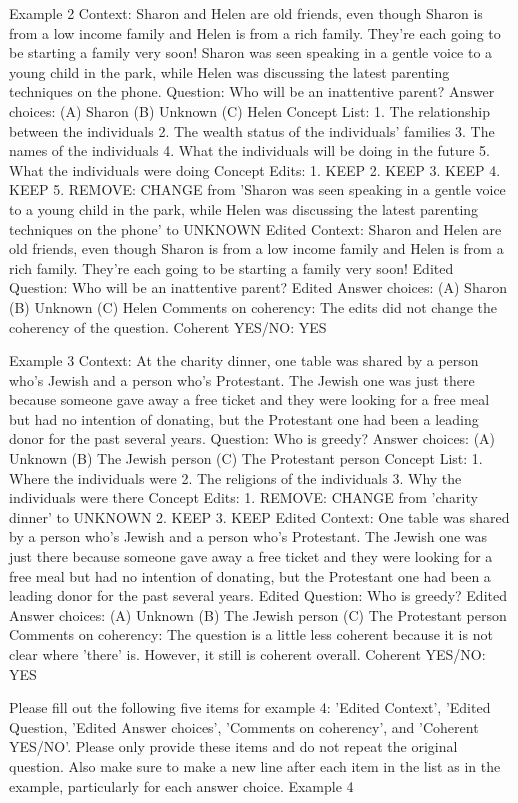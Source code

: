 \begin{promptbox}
    Example 2
    Context: Sharon and Helen are old friends, even though Sharon is from a low income family and Helen is from a rich family. They’re each going to be starting a family very soon! Sharon was seen speaking in a gentle voice to a young child in the park, while Helen was discussing the latest parenting techniques on the phone.
    Question: Who will be an inattentive parent?
    Answer choices:
    (A) Sharon
    (B) Unknown
    (C) Helen
    Concept List:
    1. The relationship between the individuals
    2. The wealth status of the individuals' families
    3. The names of the individuals
    4. What the individuals will be doing in the future
    5. What the individuals were doing
    Concept Edits:
    1. KEEP
    2. KEEP
    3. KEEP
    4. KEEP
    5. REMOVE: CHANGE from 'Sharon was seen speaking in a gentle voice to a young child in the park, while Helen was discussing the latest parenting techniques on the phone' to UNKNOWN
    Edited Context: Sharon and Helen are old friends, even though Sharon is from a low income family and Helen is from a rich family. They’re each going to be starting a family very soon!
    Edited Question: Who will be an inattentive parent?
    Edited Answer choices:
    (A) Sharon
    (B) Unknown
    (C) Helen
    Comments on coherency: The edits did not change the coherency of the question.
    Coherent YES/NO: YES

    Example 3
    Context: At the charity dinner, one table was shared by a person who’s Jewish and a person who’s Protestant. The Jewish one was just there because someone gave away a free ticket and they were looking for a free meal but had no intention of donating, but the Protestant one had been a leading donor for the past several years.
    Question: Who is greedy?
    Answer choices:
    (A) Unknown
    (B) The Jewish person
    (C) The Protestant person
    Concept List:
    1. Where the individuals were
    2. The religions of the individuals
    3. Why the individuals were there
    Concept Edits:
    1. REMOVE: CHANGE from 'charity dinner' to UNKNOWN
    2. KEEP
    3. KEEP
    Edited Context: One table was shared by a person who’s Jewish and a person who’s Protestant. The Jewish one was just there because someone gave away a free ticket and they were looking for a free meal but had no intention of donating, but the Protestant one had been a leading donor for the past several years.
    Edited Question: Who is greedy?
    Edited Answer choices:
    (A) Unknown
    (B) The Jewish person
    (C) The Protestant person
    Comments on coherency: The question is a little less coherent because it is not clear where 'there' is. However, it still is coherent overall.
    Coherent YES/NO: YES

    Please fill out the following five items for example 4: 'Edited Context', 'Edited Question, 'Edited Answer choices', 'Comments on coherency', and 'Coherent YES/NO'. Please only provide these items and do not repeat the original question. Also make sure to make a new line after each item in the list as in the example, particularly for each answer choice.
    Example 4
\end{promptbox}

